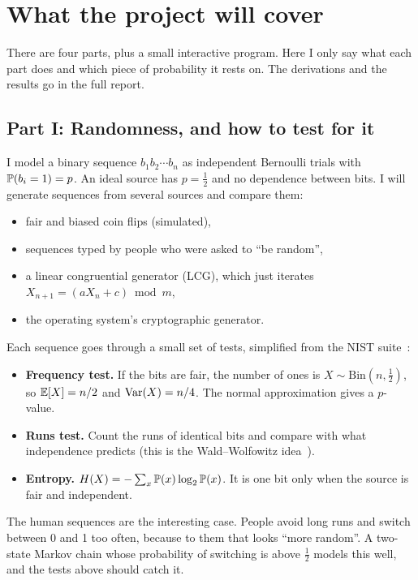 \section{What the project will cover}\label{sec:scope}

There are four parts, plus a small interactive program. Here I only say what
each part does and which piece of probability it rests on. The derivations
and the results go in the full report.

\subsection{Part I: Randomness, and how to test for it}

I model a binary sequence $b_1 b_2 \cdots b_n$ as independent Bernoulli
trials with $\mathbb{P}\!\left(b_i = 1\right) = p$. An ideal source has $p = \tfrac12$ and no
dependence between bits. I will generate sequences from several sources and
compare them:
\begin{itemize}
  \item fair and biased coin flips (simulated),
  \item sequences typed by people who were asked to ``be random'',
  \item a linear congruential generator (LCG), which just iterates
        $X_{n+1} = (aX_n + c) \bmod m$,
  \item the operating system's cryptographic generator.
\end{itemize}
Each sequence goes through a small set of tests, simplified from the NIST
suite~\cite{nistsp80022}:
\begin{itemize}
  \item \textbf{Frequency test.} If the bits are fair, the number of ones is
        $X \sim \mathrm{Bin}(n, \tfrac12)$, so $\mathbb{E}\!\left[X\right] = n/2$ and
        $\operatorname{Var}\!\left(X\right) = n/4$. The normal approximation gives a $p$-value.
  \item \textbf{Runs test.} Count the runs of identical bits and compare with
        what independence predicts (this is the Wald--Wolfowitz
        idea~\cite{wald1940}).
  \item \textbf{Entropy.} $H\!\left(X\right) = -\sum_x \mathbb{P}\!\left(x\right)\log_2\mathbb{P}\!\left(x\right)$. It is
        one bit only when the source is fair and independent.
\end{itemize}
The human sequences are the interesting case. People avoid long runs and
switch between 0 and 1 too often, because to them that looks ``more random''.
A two-state Markov chain whose probability of switching is above $\tfrac12$
models this well, and the tests above should catch it.

